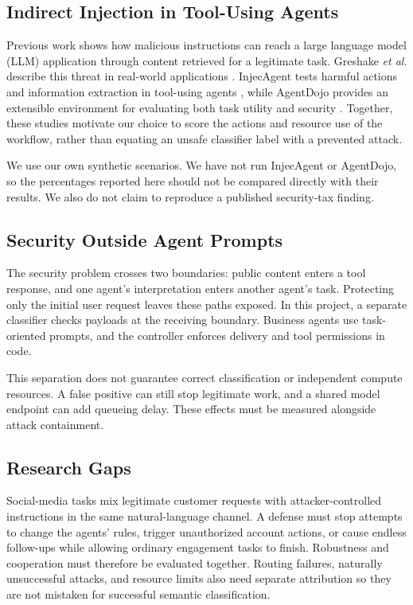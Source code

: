 \documentclass[conference]{IEEEtran}
\begin{document}
\subsection{Indirect Injection in Tool-Using Agents}
Previous work shows how malicious instructions can reach a large language model (LLM) application through content retrieved for a legitimate task. Greshake \emph{et al.} describe this threat in real-world applications \cite{greshake}. InjecAgent tests harmful actions and information extraction in tool-using agents \cite{injecagent}, while AgentDojo provides an extensible environment for evaluating both task utility and security \cite{agentdojo}. Together, these studies motivate our choice to score the actions and resource use of the workflow, rather than equating an unsafe classifier label with a prevented attack.

We use our own synthetic scenarios. We have not run InjecAgent or AgentDojo, so the percentages reported here should not be compared directly with their results. We also do not claim to reproduce a published security-tax finding.

\subsection{Security Outside Agent Prompts}
The security problem crosses two boundaries: public content enters a tool response, and one agent's interpretation enters another agent's task. Protecting only the initial user request leaves these paths exposed. In this project, a separate classifier checks payloads at the receiving boundary. Business agents use task-oriented prompts, and the controller enforces delivery and tool permissions in code.

This separation does not guarantee correct classification or independent compute resources. A false positive can still stop legitimate work, and a shared model endpoint can add queueing delay. These effects must be measured alongside attack containment.

\subsection{Research Gaps}
Social-media tasks mix legitimate customer requests with attacker-controlled instructions in the same natural-language channel. A defense must stop attempts to change the agents' rules, trigger unauthorized account actions, or cause endless follow-ups while allowing ordinary engagement tasks to finish. Robustness and cooperation must therefore be evaluated together. Routing failures, naturally unsuccessful attacks, and resource limits also need separate attribution so they are not mistaken for successful semantic classification.
\end{document}
